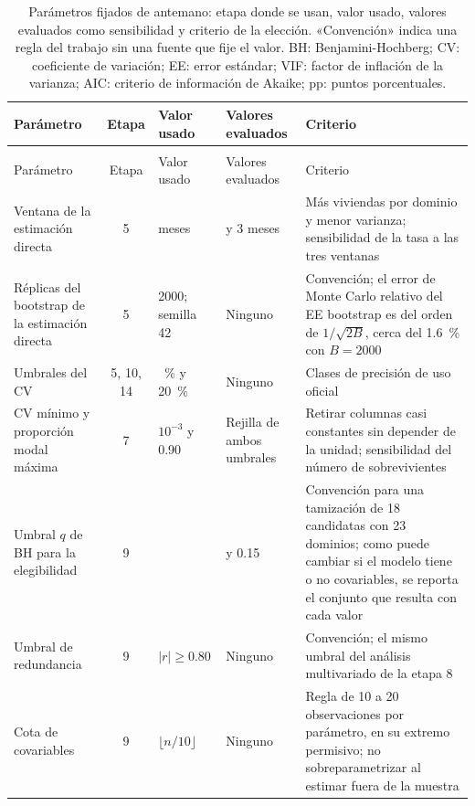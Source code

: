 {\footnotesize\renewcommand{\arraystretch}{1.12}
\begin{longtable}{>{\raggedright\arraybackslash}p{3.0cm} c >{\raggedright\arraybackslash}p{1.8cm} >{\raggedright\arraybackslash}p{2.2cm} >{\raggedright\arraybackslash}p{3.2cm}}
\caption[Parámetros fijados de antemano]{Parámetros fijados de antemano: etapa donde se usan, valor usado, valores evaluados como sensibilidad y criterio de la elección. «Convención» indica una regla del trabajo sin una fuente que fije el valor. BH: Benjamini-Hochberg; CV: coeficiente de variación; EE: error estándar; VIF: factor de inflación de la varianza; AIC: criterio de información de Akaike; pp: puntos porcentuales.}
\label{tab:met_parametros} \\
\toprule
Parámetro & Etapa & Valor usado & Valores evaluados & Criterio \\
\midrule
\endfirsthead
\multicolumn{5}{l}{\tablename~\thetable{}, continuación} \\
\toprule
Parámetro & Etapa & Valor usado & Valores evaluados & Criterio \\
\midrule
\endhead
\bottomrule
\endlastfoot
Ventana de la estimación directa & 5 & 12 meses & 1 y 3 meses & Más viviendas por dominio y menor varianza; sensibilidad de la tasa a las tres ventanas \\
Réplicas del bootstrap de la estimación directa & 5 & \num{2000}; semilla 42 & Ninguno & Convención; el error de Monte Carlo relativo del EE bootstrap es del orden de $1/\sqrt{2B}$, cerca del 1.6~\% con $B = \num{2000}$ \\
Umbrales del CV & 5, 10, 14 & 5~\% y 20~\% & Ninguno & Clases de precisión de uso oficial \cite[pp.~14--15]{Molina2019} \\
CV mínimo y proporción modal máxima & 7 & $10^{-3}$ y 0.90 & Rejilla de ambos umbrales & Retirar columnas casi constantes sin depender de la unidad; sensibilidad del número de sobrevivientes \\
Umbral $q$ de BH para la elegibilidad & 9 & 0.10 & 0.05 y 0.15 & Convención para una tamización de 18 candidatas con 23 dominios; como puede cambiar si el modelo tiene o no covariables, se reporta el conjunto que resulta con cada valor \\
Umbral de redundancia & 9 & $|r| \geq 0.80$ & Ninguno & Convención; el mismo umbral del análisis multivariado de la etapa 8 \\
Cota de covariables & 9 & $\lfloor n/10 \rfloor$ & Ninguno & Regla de 10 a 20 observaciones por parámetro, en su extremo permisivo; no sobreparametrizar al estimar fuera de la muestra \cite[p.~453]{morales2021smallarea} \\

\end{longtable}}
